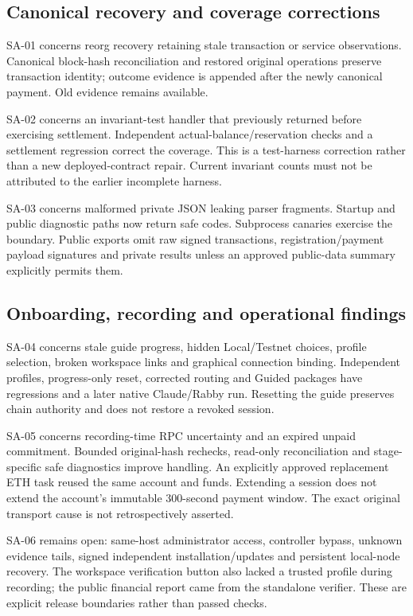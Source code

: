\subsection{Canonical recovery and coverage corrections}
SA-01 concerns reorg recovery retaining stale transaction or service observations. Canonical block-hash reconciliation and restored original operations preserve transaction identity; outcome evidence is appended after the newly canonical payment. Old evidence remains available.

SA-02 concerns an invariant-test handler that previously returned before exercising settlement. Independent actual-balance/reservation checks and a settlement regression correct the coverage. This is a test-harness correction rather than a new deployed-contract repair. Current invariant counts must not be attributed to the earlier incomplete harness.

SA-03 concerns malformed private JSON leaking parser fragments. Startup and public diagnostic paths now return safe codes. Subprocess canaries exercise the boundary. Public exports omit raw signed transactions, registration/payment payload signatures and private results unless an approved public-data summary explicitly permits them.

\subsection{Onboarding, recording and operational findings}
SA-04 concerns stale guide progress, hidden Local/Testnet choices, profile selection, broken workspace links and graphical connection binding. Independent profiles, progress-only reset, corrected routing and Guided packages have regressions and a later native Claude/Rabby run. Resetting the guide preserves chain authority and does not restore a revoked session.

SA-05 concerns recording-time RPC uncertainty and an expired unpaid commitment. Bounded original-hash rechecks, read-only reconciliation and stage-specific safe diagnostics improve handling. An explicitly approved replacement ETH task reused the same account and funds. Extending a session does not extend the account's immutable 300-second payment window. The exact original transport cause is not retrospectively asserted.

SA-06 remains open: same-host administrator access, controller bypass, unknown evidence tails, signed independent installation/updates and persistent local-node recovery. The workspace verification button also lacked a trusted profile during recording; the public financial report came from the standalone verifier. These are explicit release boundaries rather than passed checks.

